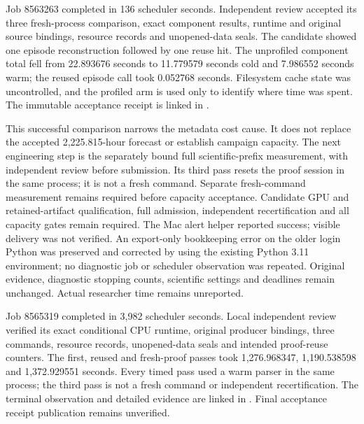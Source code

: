 
Job 8563263 completed in 136 scheduler seconds. Independent review accepted its
three fresh-process comparison, exact component results, runtime and original
source bindings, resource records and unopened-data seals. The candidate showed
one episode reconstruction followed by one reuse hit. The unprofiled component
total fell from 22.893676 seconds to 11.779579 seconds cold and 7.986552 seconds
warm; the reused episode call took 0.052768 seconds. Filesystem cache state was
uncontrolled, and the profiled arm is used only to identify where time was spent.
The immutable acceptance receipt is linked in
.

This successful comparison narrows the metadata cost cause. It does not replace
the accepted 2,225.815-hour forecast or establish campaign capacity. The next
engineering step is the separately bound full scientific-prefix measurement,
with independent review before submission. Its third pass resets the proof
session in the same process; it is not a fresh command. Separate fresh-command
measurement remains required before capacity acceptance. Candidate GPU and
retained-artifact qualification, full admission, independent recertification and
all capacity gates remain required. The Mac alert helper reported success;
visible delivery was not verified. An export-only bookkeeping error on the older
login Python was preserved and corrected by using the existing Python 3.11
environment; no diagnostic job or scheduler observation was repeated. Original
evidence, diagnostic stopping counts, scientific settings and deadlines remain
unchanged. Actual researcher time remains unreported.


Job 8565319 completed in 3,982 scheduler seconds. Local independent review verified
its exact conditional CPU runtime, original producer bindings, three commands,
resource records, unopened-data seals and intended proof-reuse counters. The
first, reused and fresh-proof passes took 1,276.968347, 1,190.538598 and
1,372.929551 seconds. Every timed pass used a warm parser in the same process;
the third pass is not a fresh command or independent recertification. The
terminal observation and detailed evidence are linked in
. Final acceptance receipt publication
remains unverified.

